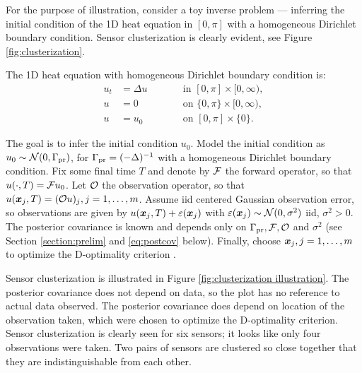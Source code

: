 For the purpose of illustration, consider a toy inverse problem ---
inferring the initial condition of the 1D heat equation in $[0,\pi]$
with a homogeneous Dirichlet boundary condition. Sensor clusterization
is clearly evident, see Figure \ref{fig:clusterization}.

The 1D heat equation with homogeneous Dirichlet boundary condition is:
\begin{subequations}\label{eq:heat equation}
  \begin{alignat}{2}
    u_t &= \Delta u &&\qquad \text{in } [0,\pi] \times [0,\infty),\\
      u &= 0 &&\qquad \text{on } \{0, \pi\} \times [0,\infty),\\
        u &= u_0 &&\qquad \text{on }[0,\pi] \times \{0\}.
  \end{alignat}
\end{subequations}


The goal is to infer the initial condition $u_0$. Model the initial
condition as $u_0 \sim \mathcal{N}(0,\Gamma_{\textup{pr}})$, for $\Gamma_{\textup{pr}} =
(-\Delta)^{-1}$ with a homogeneous Dirichlet boundary condition. Fix
some final time $T$ and denote by $\mathcal{F}$ the forward operator, so that
$u(\cdot, T) = \mathcal{F} u_0$. Let $\mathcal{O}$ the observation operator, so that
$u({\boldsymbol{x}}_j,T) = (\mathcal{O} u)_j, j=1,\dots,m$. Assume iid centered Gaussian
observation error, so observations are given by $u({\boldsymbol{x}}_j,T) +
\varepsilon({\boldsymbol{x}}_j)$ with $\varepsilon({\boldsymbol{x}}_j) \sim \mathcal{N}(0, \sigma^2)$ iid, $\sigma^2
> 0$. The posterior covariance is known and depends only on $\Gamma_{\textup{pr}},
\mathcal{F}, \mathcal{O}$ and $\sigma^2$ \cite{Stuart10} (see Section
\ref{section:prelim} and \eqref{eq:postcov} below). Finally, choose
${\boldsymbol{x}}_j,j=1,\dots,m$ to optimize the D-optimality criterion
\cite{AlexanderianGloorGhattas14}.

Sensor clusterization is illustrated in Figure \ref{fig:clusterization
  illustration}. The posterior covariance does not depend on data, so
the plot has no reference to actual data observed. The posterior
covariance does depend on location of the observation taken, which
were chosen to optimize the D-optimality criterion. Sensor
clusterization is clearly seen for six sensors; it looks like only
four observations were taken. Two pairs of sensors are clustered so
close together that they are indistinguishable from each other.


